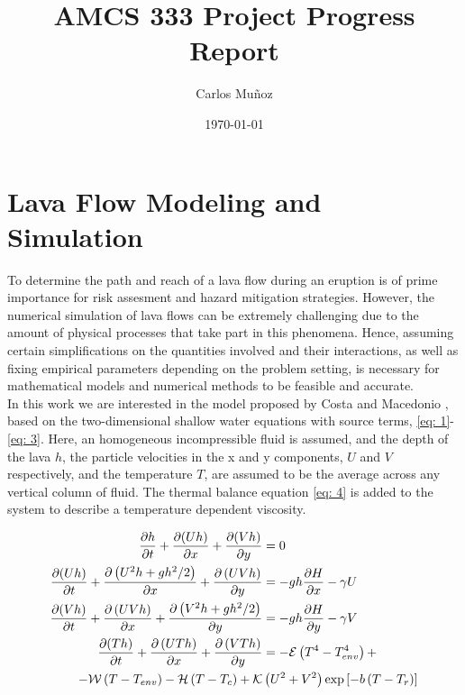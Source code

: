 \documentclass[12pt]{article}
\title{AMCS 333 Project Progress Report}
\author{Carlos Muñoz}
\date{\today}
\begin{document}
\maketitle

\section{Lava Flow Modeling and Simulation}

To determine the path and reach of a lava flow during an eruption is of prime importance for risk assesment and hazard mitigation strategies.
However, the numerical simulation of lava flows can be extremely challenging due to the amount of physical processes that take part in this phenomena.
Hence, assuming certain simplifications on the quantities involved and their interactions, as well as fixing empirical parameters depending on the problem setting,  is necessary for  mathematical models and numerical methods to be feasible and accurate.\\


In this work we are interested in the model proposed by Costa and Macedonio \cite{costa2005numerical}, based on the two-dimensional shallow water equations with source terms, \eqref{eq: 1}-\eqref{eq: 3}.
Here, an homogeneous incompressible fluid is assumed, and the depth of the lava $h$, the particle velocities in the x and y components, $U$ and $V$ respectively, and the temperature $T$, are assumed to be the average across any vertical column of fluid. 
The thermal balance equation \eqref{eq: 4} is added to the system to describe a temperature dependent viscosity.


\begin{align}
\frac{\partial h}{\partial t}+\frac{\partial(U h)}{\partial x}+\frac{\partial(V h)}{\partial y}&=0 \label{eq: 1}\\
\frac{\partial(U h)}{\partial t}+\frac{\partial\left( U^{2} h+g h^{2} / 2\right)}{\partial x}+\frac{\partial\left( U V h\right)}{\partial y}&=-g h \frac{\partial H}{\partial x}-\gamma U \label{eq: 2}\\
\frac{\partial(V h)}{\partial t}+\frac{\partial\left( U V h\right)}{\partial x}+\frac{\partial\left( V^{2} h+g h^{2} / 2\right)}{\partial y}&=-g h \frac{\partial H}{\partial y}-\gamma V \label{eq: 3}\\
\frac{\partial(T h)}{\partial t}+\frac{\partial\left( U T h\right)}{\partial x}+\frac{\partial\left( V T h\right)}{\partial y}&=-\mathcal{E}\left(T^{4}-T_{e n v}^{4}\right)+ \label{eq: 4}\\
    \quad-\mathcal{W}\left(T-T_{e n v}\right)-\mathcal{H}\left(T-T_{c}\right)+\mathcal{K}& \left(U^{2}+V^{2}\right) \exp \left[-b\left(T-T_{r}\right)\right] \notag
\end{align}
\end{document}
